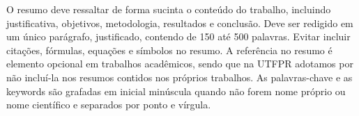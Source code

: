 
\begin{resumoutfpr}%
O resumo deve ressaltar de forma sucinta o conteúdo do trabalho, incluindo justificativa, objetivos, metodologia, resultados e conclusão. Deve ser redigido em um único parágrafo, justificado, contendo de 150 até 500 palavras. Evitar incluir citações, fórmulas, equações e símbolos no resumo. A referência no resumo é elemento opcional em trabalhos acadêmicos, sendo que na UTFPR adotamos por não incluí-la nos resumos contidos nos próprios trabalhos. As palavras-chave e as keywords são grafadas em inicial minúscula quando não forem nome próprio ou nome científico e separados por ponto e vírgula.
\end{resumoutfpr}

